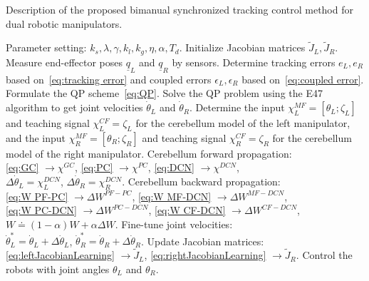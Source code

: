 \documentclass[journal,twoside,web]{ieeecolor}
\begin{document}
\begin{algorithm}[tbp]
  \caption{Description of the proposed bimanual synchronized tracking control method for dual robotic manipulators.}
  \begin{algorithmic}[1]
    \STATE Parameter setting: $k_s,\lambda,\gamma,k_l, k_g,\eta, \alpha, T_d$.
    \STATE Initialize Jacobian matrices $\tilde{J}_L,\tilde{J}_R$.
      \STATE Measure end-effector poses $\underline{q}_L$ and $\underline{q}_R$  by sensors.
      \STATE Determine tracking errors $e_L,e_R$ based on~\eqref{eq:tracking error} and coupled errors $\epsilon_L, \epsilon_R$ based on~\eqref{eq:coupled error}.
      \STATE Formulate the QP scheme~\eqref{eq:QP}.
      \STATE Solve the QP problem using the E47 algorithm to get joint velocities $\dot{\theta}_L$ and $\dot{\theta}_R$. 
      \STATE Determine the input $\chi^{MF}_L=[\theta_L; \zeta_L]$ and teaching signal $\chi^{CF}_L=\zeta_L$ for the cerebellum model of the left manipulator, and the input $\chi^{MF}_R=[\theta_R; \zeta_R]$ and teaching signal $\chi^{CF}_R=\zeta_R$ for the cerebellum model of the right manipulator.
      \STATE Cerebellum forward propagation: \\
            \eqref{eq:GC} $\to \chi^{GC}$, \eqref{eq:PC} $\to \chi^{PC}$, \eqref{eq:DCN} $\to \chi^{DCN}$, \\ 
            $\Delta \dot{\theta}_L = \chi^{DCN}_L$, $\Delta \dot{\theta}_R = \chi^{DCN}_R$.
      \STATE Cerebellum backward propagation: \\
            \eqref{eq:W PF-PC} $\to \Delta W^{PF-PC}$, \eqref{eq:W MF-DCN} $\to \Delta W^{MF-DCN}$, \\ 
            \eqref{eq:W PC-DCN} $\to \Delta W^{PC-DCN}$, \eqref{eq:W CF-DCN} $\to \Delta W^{CF-DCN}$, \\
            $W \doteq (1-\alpha) W + \alpha \Delta W$.
      \STATE Fine-tune joint velocities: \\
            $\dot{\theta}_L^\ast = \dot{\theta}_L + \Delta \dot{\theta}_L$, $\dot{\theta}_R^\ast = \dot{\theta}_R + \Delta \dot{\theta}_R$.
      \STATE Update Jacobian matrices: \eqref{eq:leftJacobianLearning} $\to \tilde{J}_L$, \eqref{eq:rightJacobianLearning} $\to \tilde{J}_R$.
      \STATE Control the robots with joint angles $\theta_L$ and $\theta_R$.
    \ENDFOR
  \end{algorithmic}
  \label{algorithm:CI-SyncTC}
\end{algorithm}
\end{document}
